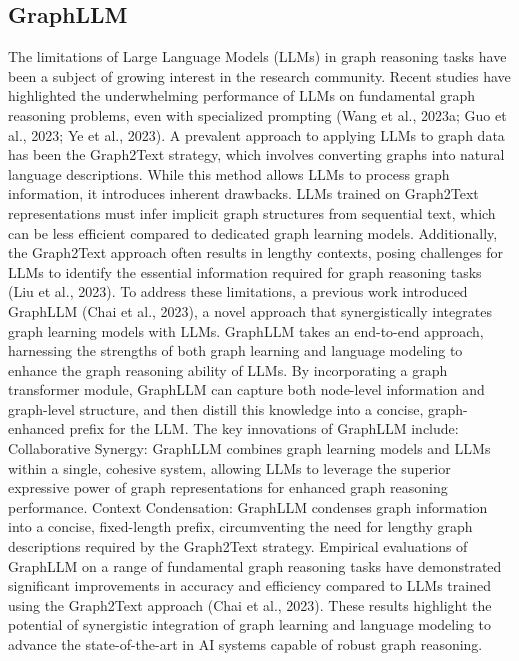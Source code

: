 \documentclass{sigkddExp}
\begin{document}
\subsection{GraphLLM}
\vspace{3mm}
The limitations of Large Language Models (LLMs) in graph reasoning tasks have been a subject of growing interest in the research community. Recent studies have highlighted the underwhelming performance of LLMs on fundamental graph reasoning problems, even with specialized prompting (Wang et al., 2023a; Guo et al., 2023; Ye et al., 2023).
\vspace{3mm}\newline
A prevalent approach to applying LLMs to graph data has been the Graph2Text strategy, which involves converting graphs into natural language descriptions. While this method allows LLMs to process graph information, it introduces inherent drawbacks. LLMs trained on Graph2Text representations must infer implicit graph structures from sequential text, which can be less efficient compared to dedicated graph learning models. Additionally, the Graph2Text approach often results in lengthy contexts, posing challenges for LLMs to identify the essential information required for graph reasoning tasks (Liu et al., 2023).
\vspace{3mm}\newline
To address these limitations, a previous work introduced GraphLLM (Chai et al., 2023), a novel approach that synergistically integrates graph learning models with LLMs. GraphLLM takes an end-to-end approach, harnessing the strengths of both graph learning and language modeling to enhance the graph reasoning ability of LLMs. By incorporating a graph transformer module, GraphLLM can capture both node-level information and graph-level structure, and then distill this knowledge into a concise, graph-enhanced prefix for the LLM.
\vspace{3mm}\newline
The key innovations of GraphLLM include:\newline
Collaborative Synergy: GraphLLM combines graph learning models and LLMs within a single, cohesive system, allowing LLMs to leverage the superior expressive power of graph representations for enhanced graph reasoning performance.\newline
Context Condensation: GraphLLM condenses graph information into a concise, fixed-length prefix, circumventing the need for lengthy graph descriptions required by the Graph2Text strategy.
\vspace{3mm}\newline
Empirical evaluations of GraphLLM on a range of fundamental graph reasoning tasks have demonstrated significant improvements in accuracy and efficiency compared to LLMs trained using the Graph2Text approach (Chai et al., 2023). These results highlight the potential of synergistic integration of graph learning and language modeling to advance the state-of-the-art in AI systems capable of robust graph reasoning.
\end{document}
